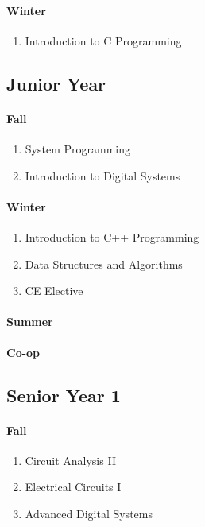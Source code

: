 \documentclass[12pt]{article}
\numberwithin{figure}{section}
\numberwithin{equation}{section}
\begin{document}
{\paragraph{Winter}\label{sophomore-winter}
\begin{enumerate}
    \item   Introduction to C Programming
\end{enumerate}

\subsection{Junior Year}\label{junior-year}
\paragraph{Fall}\label{junior-fall}
\begin{enumerate}
    \item   System Programming
    \item   Introduction to Digital Systems
\end{enumerate}
\paragraph{Winter}\label{junior-winter}
\begin{enumerate}
    \item   Introduction to C++ Programming
    \item   Data Structures and Algorithms
    \item   CE Elective
\end{enumerate}
\paragraph{Summer}\label{junior-summer}
\textbf{Co-op}

\subsection{Senior Year 1}\label{senior-year-1}
\paragraph{Fall}\label{senior-fall-1}
\begin{enumerate}
    \item   Circuit Analysis II
    \item   Electrical Circuits I
    \item   Advanced Digital Systems
\end{enumerate}
}
\end{document}
